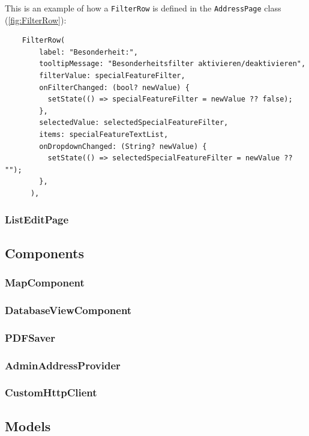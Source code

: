 This is an example of how a \texttt{FilterRow} is defined in the \texttt{AddressPage} class (\ref{fig:FilterRow}):
\lstset{style=mycsharp, caption=FilterRow in AddressPage}
\begin{lstlisting}
    FilterRow(
        label: "Besonderheit:",
        tooltipMessage: "Besonderheitsfilter aktivieren/deaktivieren",
        filterValue: specialFeatureFilter,
        onFilterChanged: (bool? newValue) {
          setState(() => specialFeatureFilter = newValue ?? false);
        },
        selectedValue: selectedSpecialFeatureFilter,
        items: specialFeatureTextList,
        onDropdownChanged: (String? newValue) {
          setState(() => selectedSpecialFeatureFilter = newValue ?? "");
        },
      ),
\end{lstlisting}




 

\subsubsection{ListEditPage}


\subsection{Components}


\subsubsection{MapComponent}

\subsubsection{DatabaseViewComponent}

\subsubsection{PDFSaver}

\subsubsection{AdminAddressProvider}

\subsubsection{CustomHttpClient}

\subsection{Models}

